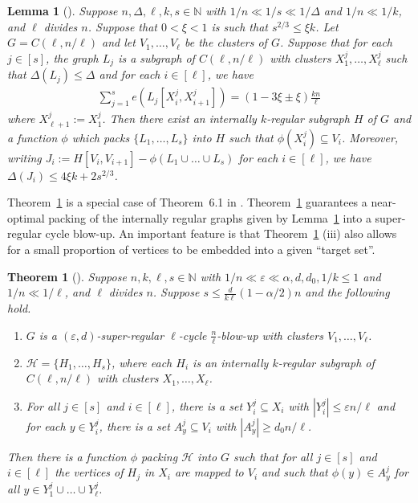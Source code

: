 \documentclass[a4paper, 11pt, reqno]{amsart}
\newtheorem{theorem}[definition]{Theorem}
\newtheorem{lemma}[definition]{Lemma}
\numberwithin{equation}{section}
\newcommand{\1}{{\rm 1\hspace*{-0.4ex}%
\rule{0.1ex}{1.52ex}\hspace*{0.2ex}}}
\newcommand{\N}{\mathbb N}
\newcommand{\cH}{\mathcal{H}}
\renewcommand{\epsilon}{\varepsilon}
\newcommand{\sub}{\subseteq}
\begin{document}
\begin{lemma}[\cite{KKOT16}] \label{packing into regular}
Suppose $n,\Delta,\ell,k,s\in \N$ with $1/n\ll 1/s \ll  1/\Delta$ and $1/n\ll 1/k$, and $\ell$ divides $n$. Suppose that $0<\xi<1$ is such that $s^{2/3} \leq \xi k$.
Let $G=C(\ell,n/\ell)$ and let $V_1,\dots, V_\ell$ be the clusters of $G$. 
Suppose that for each $j\in [s]$, 
the graph $L_j$ is a subgraph of $C(\ell,n/\ell)$ with clusters $X_1^j,\dots,X_\ell^j$ such that $\Delta(L_j)\leq \Delta$ and for each $i\in[\ell]$, we have
\begin{align}
\sum_{j=1}^{s} e(L_j[X_i^j,X_{i+1}^j]) = (1-3\xi\pm \xi)\frac{kn}{\ell}
\end{align}
where $X_{\ell+1}^j:=X_1^{j}$.
Then there exist an internally $k$-regular subgraph $H$ of $G$ and 
a function $\phi$ which packs $\{L_1,\ldots, L_s\}$ into $H$ such that $\phi(X^j_i)\sub V_i$.
Moreover, writing $J_{i}:=H[V_i,V_{i+1}]-\phi(L_1\cup\dots\cup L_s)$ for each $i\in[\ell]$, 
we have $\Delta(J_{i})\leq 4\xi k  +2s^{2/3}$. 
\end{lemma}
Theorem~\ref{thm: blow up} is a special case of Theorem~6.1 in \cite{KKOT16}. Theorem~\ref{thm: blow up} guarantees a near-optimal packing of the internally regular graphs given by Lemma~\ref{packing into regular} into a super-regular cycle blow-up. An important feature is that Theorem~\ref{thm: blow up} (iii) also allows for a small proportion of vertices to be embedded into a given ``target set''.
\begin{theorem}[\cite{KKOT16}]\label{thm: blow up}
Suppose $n,k,\ell,s \in \N$ with $1/n \ll  \epsilon \ll \alpha, d,d_0,1/k \leq 1$ and $1/n \ll 1/\ell$, and $\ell$ divides $n$. Suppose $s\leq \frac{d}{k\ell}(1-\alpha/2)n$ and the following hold.
\begin{enumerate}[label=(\roman*)]
\item $G$ is a $(\epsilon,d)$-super-regular $\ell$-cycle $\frac{n}{\ell}$-blow-up with clusters $V_1,\ldots, V_\ell$.
\item $\cH=\{H_1,\dots, H_{s}\}$, where each $H_i$ is an internally $k$-regular subgraph of $C(\ell,n/\ell)$
with clusters $X_1,\ldots,X_\ell$.
\item For all $j \in [s]$ and $i\in [\ell]$, 
there is a set $Y_i^j\subseteq X_i$ with $|Y_i^j|\leq \epsilon n/\ell$ and for each $y\in Y_i^j$, 
there is a set $A^j_{y}\subseteq V_i$ with $|A^j_y|\geq d_0n/\ell$. 
\end{enumerate}
Then there is a function $\phi$ packing $\cH$ into $G$ such that for all $j\in[s]$ and $i\in [\ell]$ the vertices of $H_j$ in $X_i$ are mapped to $V_i$ and such that $\phi(y)\in A^j_y$ for all $y\in Y^j_1\cup \dots\cup Y^j_{\ell}$.
\end{theorem}
\end{document}
